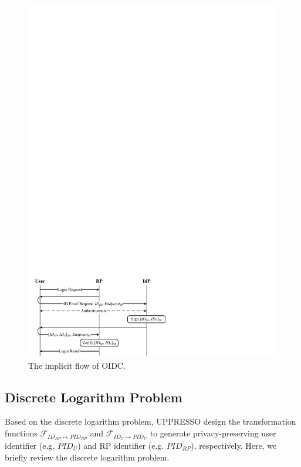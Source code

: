 \begin{figure}[t]
  \centering
  \includegraphics[width=\linewidth]{fig/OIDC1.pdf}
  \caption{The implicit flow of OIDC.}
  \label{fig:OpenID}
\end{figure}

\subsection{Discrete Logarithm Problem}
\label{sec:dlp}

Based on the discrete logarithm problem, UPPRESSO design the transformation functions $\mathcal{F}_{ID_{RP} \mapsto PID_{RP}}$ and $\mathcal{F}_{ID_{U} \mapsto PID_{U}}$ to generate privacy-preserving user identifier (e.g. $PID_U$) and RP identifier (e.g. $PID_{RP}$), respectively. Here, we briefly review the discrete logarithm problem.

